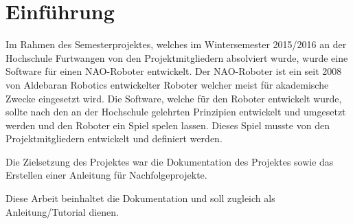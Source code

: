 \chapter{Einführung}

    Im Rahmen des Semesterprojektes, welches im Wintersemester 2015/2016 an der
    Hochschule Furtwangen von den Projektmitgliedern absolviert wurde, wurde
    eine Software für einen NAO-Roboter entwickelt.
    Der NAO-Roboter ist ein seit 2008 von Aldebaran Robotics entwickelter
    Roboter welcher meist für akademische Zwecke eingesetzt wird.
    Die Software, welche für den Roboter entwickelt wurde, sollte nach den an
    der Hochschule gelehrten Prinzipien entwickelt und umgesetzt werden und den
    Roboter ein Spiel spelen lassen.
    Dieses Spiel musste von den Projektmitgliedern entwickelt und definiert
    werden.

    Die Zielsetzung des Projektes war die Dokumentation des Projektes sowie das
    Erstellen einer Anleitung für Nachfolgeprojekte.

    Diese Arbeit beinhaltet die Dokumentation und soll zugleich als
    Anleitung/Tutorial dienen.

